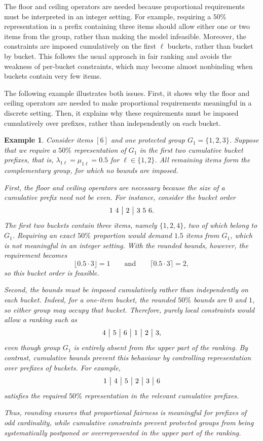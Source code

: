 \documentclass[pdflatex,basic,Numbered]{jnl}%
\theoremstyle{plain}
\newtheorem{example}{Example}
\theoremstyle{remark}
\theoremstyle{thmstyleone}%
\theoremstyle{thmstylethree}%
\begin{document}
The floor and ceiling operators are needed because proportional requirements must be interpreted in an integer setting. For example, requiring a \(50\%\) representation in a prefix containing three items should allow either one or two items from the group, rather than making the model infeasible. Moreover, the constraints are imposed cumulatively on the first \(\ell\) buckets, rather than bucket by bucket. This follows the usual approach in fair ranking \citep{wei2022rank,chakraborty2025improved} and avoids the weakness of per-bucket constraints, which may become almost nonbinding when buckets contain very few items.

The following example illustrates both issues. First, it shows why the floor and ceiling operators are needed to make proportional requirements meaningful in a discrete setting. Then, it explains why these requirements must be imposed cumulatively over prefixes, rather than independently on each bucket.

\begin{example}
Consider items $[6]$ and one protected group \(G_1=\{1,2,3\}\). Suppose that we require a \(50\%\) representation of \(G_1\) in the first two cumulative bucket prefixes, that is, \(\lambda_{1\ell}=\mu_{1\ell}=0.5\) for \(\ell\in\{1,2\}\). All remaining items form the complementary group, for which no bounds are imposed.

First, the floor and ceiling operators are necessary because the size of a cumulative prefix need not be even. For instance, consider the bucket order
\[
{\rm 1\ 4\ \big|\ 2\ \big|\ 3\ 5\ 6}.
\]
The first two buckets contain three items, namely \(\{1,2,4\}\), two of which belong to \(G_1\). Requiring an exact \(50\%\) proportion would demand \(1.5\) items from \(G_1\), which is not meaningful in an integer setting. With the rounded bounds, however, the requirement becomes
\[
\lfloor 0.5\cdot 3\rfloor = 1
\qquad\text{and}\qquad
\lceil 0.5\cdot 3\rceil = 2,
\]
so this bucket order is feasible.

Second, the bounds must be imposed cumulatively rather than independently on each bucket. Indeed, for a one-item bucket, the rounded \(50\%\) bounds are \(0\) and \(1\), so either group may occupy that bucket. Therefore, purely local constraints would allow a ranking such as
\[
{\rm 4\ \big|\ 5\ \big|\ 6\ \big|\ 1\ \big|\ 2\ \big|\ 3},
\]
even though group \(G_1\) is entirely absent from the upper part of the ranking. By contrast, cumulative bounds prevent this behaviour by controlling representation over prefixes of buckets. For example,
\[
{\rm 1\ \big|\ 4\ \big|\ 5\ \big|\ 2\ \big|\ 3\ \big|\ 6}
\]
satisfies the required \(50\%\) representation in the relevant cumulative prefixes.

Thus, rounding ensures that proportional fairness is meaningful for prefixes of odd cardinality, while cumulative constraints prevent protected groups from being systematically postponed or overrepresented in the upper part of the ranking.
\end{example}
\end{document}
